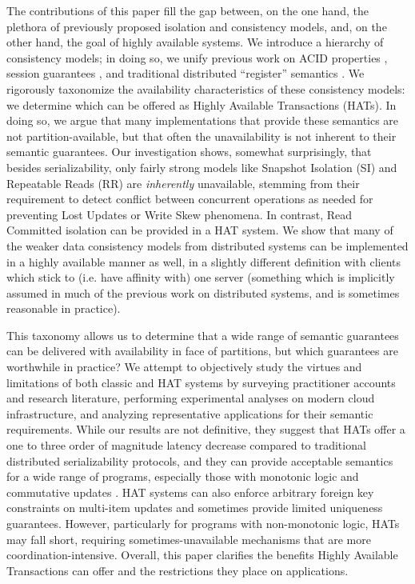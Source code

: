 The contributions of this paper fill the gap between, on the one hand, the plethora of previously proposed isolation and consistency models, and, on the other hand, the goal of highly available systems. We introduce a hierarchy of consistency models; in doing so, we unify previous work on ACID properties \cite{4}, session guarantees \cite{64}, and traditional distributed “register” semantics \cite{45}. We rigorously taxonomize the availability characteristics of these consistency models: we determine which can be offered as Highly Available Transactions (HATs). In doing so, we argue that many implementations that provide these semantics are not partition-available, but that often the unavailability is not inherent to their semantic guarantees. Our investigation shows, somewhat surprisingly, that besides serializability, only fairly strong models like Snapshot Isolation (SI) and Repeatable Reads (RR) are \emph{inherently} unavailable, stemming from their requirement to detect conflict between concurrent operations as needed for preventing Lost Updates or Write Skew phenomena. In contrast, Read Committed isolation can be provided in a HAT system. We show that many of the weaker data consistency models from distributed systems can be implemented in a highly available manner as well, in a slightly different definition with clients which stick to (i.e. have affinity with) one server (something which is implicitly assumed in much of the previous work on distributed systems, and is sometimes reasonable in practice).

This taxonomy allows us to determine that a wide range of semantic guarantees can be delivered with availability in face of partitions, but which guarantees are worthwhile in practice? We attempt to objectively study the virtues and limitations of both classic and HAT systems by surveying practitioner accounts and research literature, performing experimental analyses on modern cloud infrastructure, and analyzing representative applications for their semantic requirements. While our results are not definitive, they suggest that HATs offer a one to three order of magnitude latency decrease compared to traditional distributed serializability protocols, and they can provide acceptable semantics for a wide range of programs, especially those with monotonic logic and commutative updates \cite{6, 24, 61}. HAT systems can also enforce arbitrary foreign key constraints on multi-item updates and sometimes provide limited uniqueness guarantees. However, particularly for programs with non-monotonic logic, HATs may fall short, requiring sometimes-unavailable mechanisms that are more coordination-intensive. Overall, this paper clarifies the benefits  Highly Available Transactions can offer and the restrictions they place on applications.
